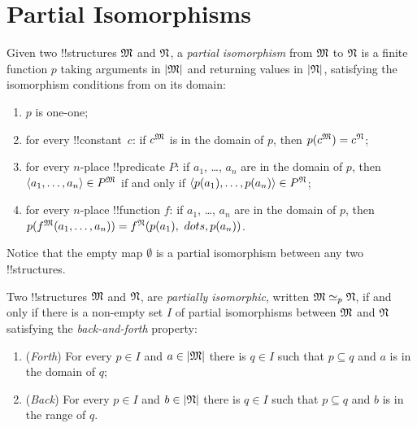 \documentclass[../../include/open-logic-section]{subfiles}
\begin{document}
\section{Partial Isomorphisms}

\begin{defn}
  Given two !!{structure}s $\mathfrak M$ and $\mathfrak N$, a
  \emph{partial isomorphism} from $\mathfrak M$ to $\mathfrak N$ is a
  finite function $p$ taking arguments in $\left| \mathfrak M \right|$ and returning
  values in $\left| \mathfrak N \right|$, satisfying the isomorphism conditions from
   on its domain:
  \begin{enumerate}
  \item $p$ is one-one;
  \item for every !!{constant}~$c$: if $c^{\mathfrak M}$ is in the domain
    of $p$, then $p(c^{\mathfrak M}) = c^{\mathfrak N}$;
  \item for every $n$-place !!{predicate} $P$: if $a_1$, \dots, $a_n$
    are in the domain of $p$, then $\langle a_1, \dots, a_n\rangle \in
    P^{\mathfrak M}$ if and only if $\langle p(a_1), \dots, p(a_n) \rangle
    \in P^{\mathfrak N}$;
  \item for every $n$-place !!{function} $f$: if $a_1$, \dots, $a_n$
    are in the domain of $p$, then $p(f^{\mathfrak M} (a_1, \dots,a_n))
    = f^{\mathfrak N} (p(a_1), \ dots, p(a_n))$.
  \end{enumerate}
\end{defn}

Notice that the empty map $\emptyset$ is a partial isomorphism
between any two !!{structure}s.

\begin{defn}
  Two !!{structure}s $\mathfrak M$ and $\mathfrak N$, are
  \emph{partially isomorphic}, written $\Struct{M} \iso[p]
  \Struct{N}$, if and only if there is a non-empty set $I$
  of partial isomorphisms between $\mathfrak M$ and $\mathfrak N$
  satisfying the \emph{back-and-forth} property:
  \begin{enumerate}
  \item (\emph{Forth}) For every $p \in I$ and $a \in \left| \mathfrak M \right|$
    there is $q \in I$ such that $p \subseteq q$ and $a$ is
    in the domain of $q$;
  \item (\emph{Back}) For every $p \in I$ and $b \in \left| \mathfrak N \right|$
    there is $q \in I$ such that $p \subseteq q$ and $b$ is
    in the range of $q$.
  \end{enumerate}
\end{defn}
\end{document}
